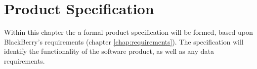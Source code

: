 \chapter{Product Specification}

Within this chapter the a formal product specification will be formed, based 
upon BlackBerry's requirements (chapter \ref{chap:requirements}). The 
specification will identify the functionality of the software product, as well
as any data requirements.

\newpage


\newpage

